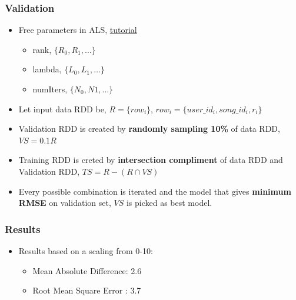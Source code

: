 \documentclass[11pt]{beamer}
\begin{document}
\begin{frame}
  \frametitle{Validation}
  \begin{itemize}
    \item Free parameters in ALS, \href{'http://spark.apache.org/docs/latest/mllib-collaborative-filtering.html'}{tutorial}
      \begin{itemize}
        \item rank, $\{R_0,R_1,\dots\}$
        \item lambda, $\{L_0,L_1,\dots\}$
        \item numIters, $\{N_0,N1,\dots\}$
      \end{itemize}
    \item Let input data RDD be, $R = \{row_i\}$, $row_i = \{user\_id_i, song\_id_i, r_i\}$
    \item Validation RDD is created by {\bf randomly sampling 10\%} of data RDD, $VS = 0.1R$
      \item Training RDD is creted by {\bf intersection compliment} of data RDD and Validation RDD,
        $TS = R - (R \cap VS)$
      \item Every possible combination is iterated and the model that gives {\bf minimum RMSE} on
        validation set, $VS$ is picked as best model.
    \end{itemize}
  \end{frame}

  \begin{frame}
    \frametitle{Results}
    \begin{itemize}
      \item Results based on a scaling from 0-10:
        \begin{itemize}
          \item Mean Absolute Difference: 2.6
          \item Root Mean Square Error  : 3.7
        \end{itemize}
    \end{itemize}
  \end{frame}
\end{document}
